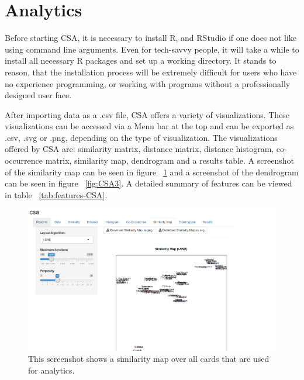 \section{Analytics}

Before starting CSA, it is necessary to install R, and RStudio if one does not 
like using command line arguments. Even for tech-savvy people, it will take a 
while to install all necessary R packages and set up a working directory. It 
stands to reason, that the installation process will be extremely difficult for 
users who have no experience programming, or working with programs without a 
professionally designed user face.

After importing data as a .csv file, CSA offers a variety of visualizations. 
These visualizations can be accessed via a Menu bar at the top and can be 
exported as .csv, .svg or .png, depending on the type of visualization. The 
visualizations offered by CSA are: similarity matrix, distance matrix, distance 
histogram, co-occurrence matrix, similarity map, dendrogram and a results 
table. A screenshot of the similarity map can be seen in figure ~\ref{fig:CSA2}
and a screenshot of the dendrogram can be seen in figure  ~\ref{fig:CSA3}.
A detailed summary of features can be viewed in table ~\ref{tab:features-CSA}. 



\begin{figure}[tp] 
\centering
\includegraphics[keepaspectratio,width=\linewidth,height=\halfh]{images/csa-similarity.png}
\caption[CSA Similarity Map] { This screenshot shows a similarity map over
all cards that are used for analytics.
 }
\label{fig:CSA2}
\end{figure}

